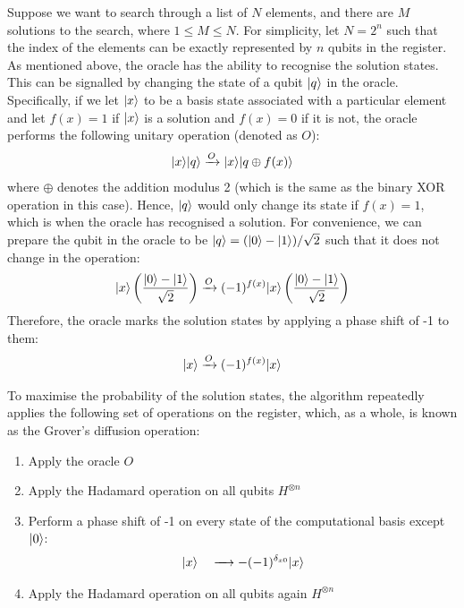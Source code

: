 \documentclass[bibliography=totocnumbered, 10pt]{article}
\theoremstyle{NoticeStyle}
\begin{document}
Suppose we want to search through a list of $N$ elements, and there are $M$ solutions to the search, where $ 1 \leq M \leq N$. For simplicity, let $N = 2^n$ such that the index of the elements can be exactly represented by $n$ qubits in the register. As mentioned above, the oracle has the ability to recognise the solution states. This can be signalled by changing the state of a qubit ${\left\vert{q}\right\rangle}$ in the oracle. Specifically, if we let ${\left\vert{x}\right\rangle}$ to be a basis state associated with a particular element and let $f(x) = 1$ if ${\left\vert{x}\right\rangle}$ is a solution and $f(x) = 0$ if it is not, the oracle performs the following unitary operation (denoted as $O$):
\begin{align}
	{\left\vert{x}\right\rangle} {\left\vert{q}\right\rangle} \xrightarrow{O} {\left\vert{x}\right\rangle} {\left\vert{q \oplus f(x)}\right\rangle}
\end{align}
where $\oplus$ denotes the addition modulus 2 (which is the same as the binary XOR operation in this case). Hence, ${\left\vert{q}\right\rangle}$ would only change its state if $f(x) = 1$, which is when the oracle has recognised a solution. For convenience, we can prepare the qubit in the oracle to be ${\left\vert{q}\right\rangle} = ({\left\vert{0}\right\rangle} - {\left\vert{1}\right\rangle}) / \sqrt{2}$ such that it does not change in the operation:
\begin{align}
	{\left\vert{x}\right\rangle} \left(\frac{{\left\vert{0}\right\rangle} - {\left\vert{1}\right\rangle}}{\sqrt{2}}\right) \xrightarrow{O} (-1)^{f(x)}{\left\vert{x}\right\rangle}\left(\frac{{\left\vert{0}\right\rangle} - {\left\vert{1}\right\rangle}}{\sqrt{2}}\right)
\end{align}
Therefore, the oracle marks the solution states by applying a phase shift of -1 to them:
\begin{align}
	{\left\vert{x}\right\rangle} \xrightarrow{O} (-1)^{f(x)}{\left\vert{x}\right\rangle} 
\end{align}

To maximise the probability of the solution states, the algorithm repeatedly applies the following set of operations on the register, which, as a whole, is known as the Grover's diffusion operation:
\begin{enumerate}
	\item Apply the oracle $O$
	\item Apply the Hadamard operation on all qubits $H^{\otimes n}$ \label{step2}
	\item Perform a phase shift of -1 on every state of the computational basis except ${\left\vert{0}\right\rangle}$:
		\begin{align}
			{\left\vert{x}\right\rangle} \quad 
			\xrightarrow 
			\quad -(-1)^{\delta_{x0}}{\left\vert{x}\right\rangle}
		\end{align}
	\item Apply the Hadamard operation on all qubits again $H^{\otimes n}$ \label{step4}
\end{enumerate}
\end{document}
